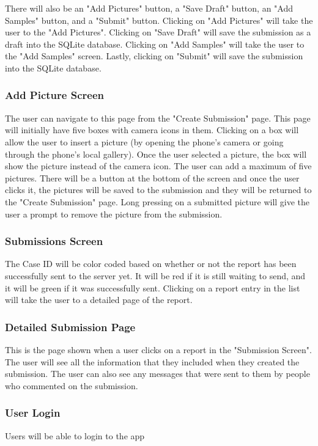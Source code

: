 \documentclass[onecolumn, draftclsnofoot,10pt, compsoc]{IEEEtran}
\begin{document}
There will also be an "Add Pictures" button, a "Save Draft" button, an "Add Samples" button, and a "Submit" button. Clicking on "Add Pictures" will take the user to the "Add Pictures". Clicking on "Save Draft" will save the submission as a draft into the SQLite database. Clicking on "Add Samples" will take the user to the "Add Samples" screen. Lastly, clicking on "Submit" will save the submission into the SQLite database.

\subsubsection{Add Picture Screen} 
The user can navigate to this page from the "Create Submission" page. This page will initially have five boxes with camera icons in them. Clicking on a box will allow the user to insert a picture (by opening the phone's camera or going through the phone's local gallery). Once the user selected a picture, the box will show the picture instead of the camera icon. The user can add a maximum of five pictures. There will be a button at the bottom of the screen and once the user clicks it, the pictures will be saved to the submission and they will be returned to the "Create Submission" page. Long pressing on a submitted picture will give the user a prompt to remove the picture from the submission.

\subsubsection{Submissions Screen}
The Case ID will be color coded based on whether or not the report has been successfully sent to the server yet. It will be red if it is still waiting to send, and it will be green if it was successfully sent. Clicking on a report entry in the list will take the user to a detailed page of the report.


\subsubsection{Detailed Submission Page}
This is the page shown when a user clicks on a report in the "Submission Screen". The user will see all the information that they included when they created the submission. The user can also see any messages that were sent to them by people who commented on the submission.

\subsubsection{User Login}
Users will be able to login to the app
\end{document}
